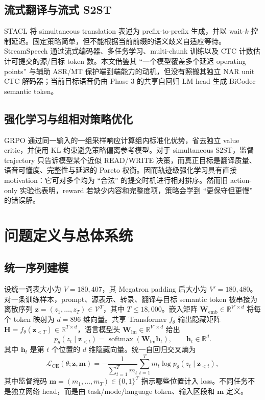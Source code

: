 \documentclass[11pt,a4paper]{article}
\newcommand{\vect}[1]{\bm{#1}}
\newcommand{\mat}[1]{\bm{#1}}
\newcommand{\R}{\mathbb{R}}
\newcommand{\Vocab}{\mathcal{V}}
\newcommand{\Loss}{\mathcal{L}}
\begin{document}
\subsection{流式翻译与流式 S2ST}

STACL 将 simultaneous translation 表述为 prefix-to-prefix 生成，并以 wait-$k$ 控制延迟\cite{ma2019stacl}。固定策略简单，但不能根据当前前缀的语义歧义自适应等待。StreamSpeech 通过流式编码器、多任务学习、multi-chunk 训练以及 CTC 计数估计可提交的源/目标 token 数\cite{zhang2024streamspeech}。本文借鉴其 ``一个模型覆盖多个延迟 operating points'' 与辅助 ASR/MT 保护端到端能力的动机，但没有照搬其独立 NAR unit CTC 解码器；当前目标语音仍由 Phase 3 的共享自回归 LM head 生成 BiCodec semantic token。

\subsection{强化学习与组相对策略优化}

GRPO 通过同一输入的一组采样响应计算组内标准化优势，省去独立 value critic，并使用 KL 约束避免策略偏离参考模型\cite{shao2024deepseekmath}。对于 simultaneous S2ST，监督 trajectory 只告诉模型某个近似 READ/WRITE 决策，而真正目标是翻译质量、语音可懂度、完整性与延迟的 Pareto 权衡。因而轨迹级强化学习具有直接 motivation：它可对多个均为 ``合法'' 的提交时机进行相对排序。然而旧 action-only 实验也表明，reward 若缺少内容和完整度项，策略会学到 ``更保守但更慢'' 的错误解。

\section{问题定义与总体系统}

\subsection{统一序列建模}

设统一词表大小为 $V=180{,}407$，其 Megatron padding 后大小为 $V'=180{,}480$。对一条训练样本，prompt、源表示、转录、翻译与目标 semantic token 被串接为离散序列 $\vect{z}=(z_1,\ldots,z_T)\in\Vocab^T$，其中 $T\leq18{,}000$。嵌入矩阵 $\mat{W}_{\mathrm{emb}}\in\R^{V'\times d}$ 将每个 token 映射为 $d=896$ 维向量。共享 Transformer $f_\theta$ 输出隐藏矩阵 $\mat{H}=f_\theta(\vect{z}_{<T})\in\R^{T\times d}$，语言模型头 $\mat{W}_{\mathrm{lm}}\in\R^{V'\times d}$ 给出
\begin{equation}
  p_\theta(z_t\mid\vect{z}_{<t})
  =\operatorname{softmax}\!\left(\mat{W}_{\mathrm{lm}}\vect{h}_t\right),
  \qquad \vect{h}_t\in\R^d.
  \label{eq:ar}
\end{equation}
其中 $\vect{h}_t$ 是第 $t$ 个位置的 $d$ 维隐藏向量。统一自回归交叉熵为
\begin{equation}
  \Loss_{\mathrm{CE}}(\theta;\vect{z},\vect{m})
  =-\frac{1}{\sum_{t=1}^{T}m_t}
  \sum_{t=1}^{T}m_t\log p_\theta(z_t\mid\vect{z}_{<t}),
  \label{eq:ce}
\end{equation}
其中监督掩码 $\vect{m}=(m_1,\ldots,m_T)\in\{0,1\}^{T}$ 指示哪些位置计入 loss。不同任务不是独立网络 head，而是由 task/mode/language token、输入区段和 $\vect{m}$ 定义。
\end{document}
